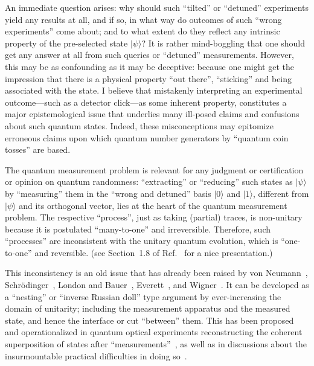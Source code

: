 \documentclass[entropy,article,accept,oneauthor,pdftex]{Definitions/mdpi}
\begin{document}
An immediate question arises: why should such ``tilted'' or ``detuned'' experiments yield any results at all, and if so, in what way do outcomes of such ``wrong experiments''
come about; and to what extent do they
reflect any intrinsic property of the pre-selected state $\vert \psi \rangle $?
It is rather mind-boggling that one should get any answer at all from such queries or ``detuned'' measurements.
However, this may be as confounding as it may be deceptive: because one might get the impression that there is a physical property ``out there'',
``sticking'' and being associated with the state.
I believe that mistakenly interpreting an experimental outcome---such as a detector click---as some inherent property,
constitutes a major epistemological issue that underlies many ill-posed claims and confusions
about such quantum states.
Indeed, these misconceptions may epitomize erroneous claims upon which quantum number generators by ``quantum coin tosses'' are based.

The quantum measurement problem is relevant for any judgment or certification or opinion on quantum randomness:
``extracting'' or ``reducing'' such states as $\vert \psi \rangle $ by ``measuring'' them in the ``wrong and detuned'' basis
$\vert 0 \rangle$ and $\vert 1 \rangle$, different from $\vert \psi \rangle $ and its orthogonal vector,
lies at the heart of the quantum measurement problem.
The respective ``process'', just as taking (partial) traces,
is non-unitary because it is postulated ``many-to-one'' and irreversible.
Therefore, such ``processes'' are inconsistent with the unitary quantum evolution, which is ``one-to-one'' and reversible.
(see Section~1.8 of Ref.~\cite{mermin-07} for a nice presentation.)

This inconsistency is an old issue that has already been raised by von Neumann~\cite{v-neumann-49,v-neumann-55},
Schr\"odinger~\cite{schrodinger-1,schrodinger-2,schrodinger-3}, London and Bauer~\cite{london-Bauer-1939,london-Bauer-1983}, Everett~\cite{everett,Barrett-2011,everett-1956}, and Wigner~\cite{wigner:mb}.
It can be developed as a ``nesting'' or ``inverse Russian doll'' type argument by ever-increasing the domain of unitarity; including the measurement
apparatus and the measured state, and hence the interface or cut ``between'' them.
This has been proposed and operationalized in quantum optical experiments reconstructing the coherent superposition of states after
``measurements''~\cite{PhysRevD.22.879,PhysRevA.25.2208,greenberger2,Nature351,Zajonc-91,PhysRevA.45.7729,PhysRevLett.73.1223,PhysRevLett.75.3783,hkwz},
as well as in discussions about the insurmountable practical difficulties in doing so~\cite{engrt-sg-I,engrt-sg-II}.
\end{document}
